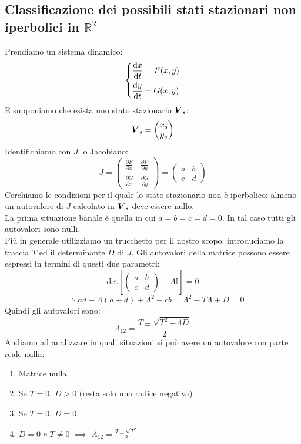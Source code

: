 \subsection{Classificazione dei possibili stati stazionari non iperbolici in $\mathbb{R}^2$}%
\label{sub:Classificazione dei possibili stati stazionari non iperbolici in R2}
Prendiamo un sistema dinamico:
\[\begin{dcases}
    \frac{\text{d} x}{\text{d} t} = F(x, y)\\
    \frac{\text{d} y}{\text{d} t} = G(x, y)
\end{dcases}\] 
E supponiamo che esista uno stato stazionario $\boldsymbol{V}_s$:
\[
    \boldsymbol{V }_s = \begin{pmatrix} x_s \\ y_s \end{pmatrix} 
\]
Identifichiamo con $J$ lo Jacobiano:
\[
    J = 
    \begin{pmatrix} 
	\frac{\partial F}{\partial x} & \frac{\partial F}{\partial y} \\
	\frac{\partial G}{\partial x} & \frac{\partial G}{\partial y} 
    \end{pmatrix} 
    = 
    \begin{pmatrix} a & b \\ c & d \end{pmatrix} 
\] 
Cerchiamo le condizioni per il quale lo stato stazionario non è iperbolico: almeno un autovalore di $J$ calcolato in $\boldsymbol{V}_s$ deve essere nullo.\\
La prima situazione banale è quella in cui $a = b = c = d = 0$. In tal caso tutti gli autovalori sono nulli. \\
Più in generale utilizziamo un trucchetto per il nostro scopo: introduciamo la traccia $T$ ed il determinante $D$ di $J$. Gli autovalori della matrice possono essere espressi in termini di questi due parametri:
\[
    \text{det}\left[\begin{pmatrix} a & b \\ c & d \end{pmatrix} - \Lambda  \mathbb{I}\right] = 0 
\] 
\[
    \implies  a d - \Lambda (a + d) + \Lambda^2 - c b = \Lambda^2 - T\Lambda + D = 0
\] 
Quindi gli autovalori sono:
\[
    \Lambda_{12} = \frac{T \pm \sqrt{T^2 - 4D}}{2}
\] 
Andiamo ad analizzare in quali situazioni si può avere un autovalore con parte reale nulla: 
\begin{enumerate}
    \item Matrice nulla. 
    \item Se $T=0$, $D > 0$ (resta solo una radice negativa)
    \item Se $T = 0$, $D = 0$.
    \item $D = 0$ e $T \neq 0$ $\implies$ $\Lambda_{12} = \frac{T \pm \sqrt{T^2} }{2}$  
\end{enumerate}
